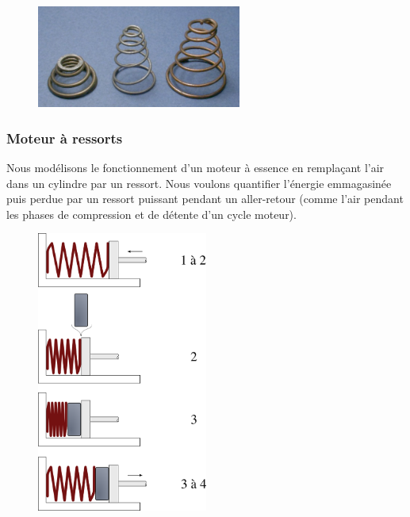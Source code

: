 	\begin{figure}
		\begin{center}
			\includegraphics[width=0.6\textwidth]{images/ressorts_coniques.jpg}
		\end{center}
		\label{fig_ressorts_coniques}
	\end{figure}
	

\subsubsection{Moteur à ressorts}
\label{exo_ressorts_moteur}
	
	Nous modélisons le fonctionnement d’un moteur à essence en remplaçant l’air dans un cylindre par un ressort. Nous voulons quantifier l’énergie emmagasinée puis perdue par un ressort puissant pendant un aller-retour (comme l’air pendant les phases de compression et de détente d’un cycle moteur).

	\begin{figure}
	\begin{center}
		\includegraphics[width=0.5\textwidth]{images/piston_ressorts.png}
	\end{center}
	\label{fig_pistons_ressorts}
	\end{figure}

